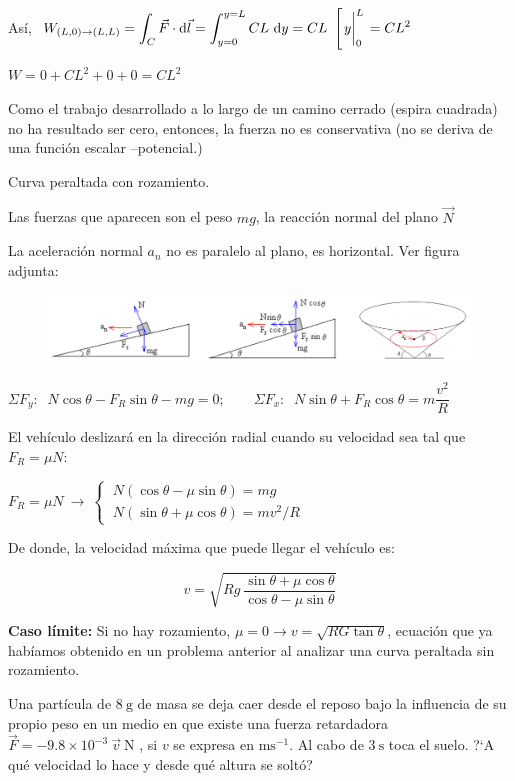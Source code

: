 Así, $\ \displaystyle W_{(L,0) \to (L,L)} = \int_C \vec F \cdot \dd \vec l = \int_{y=0}^{y=L} C L \ \dd y= C L \ \left[ \eval{y}_0^L \right.=C L^2$

$W=0+CL^2+0+0=CL^2$

Como el trabajo desarrollado a lo largo de un camino cerrado (espira cuadrada) no ha resultado ser cero, entonces, la fuerza no es conservativa (no se deriva de una función escalar --potencial.) 


\begin{prob}
Curva peraltada con rozamiento.	
\end{prob}

Las fuerzas que aparecen son el peso $mg$, la reacción normal del plano $\vec N$

La aceleración normal $a_n$ no es paralelo al plano, es horizontal. Ver figura adjunta:

\begin{figure}[H]
	\centering
	\includegraphics[width=1\textwidth]{imagenes/imagenes03/T03IM56.png}
	\end{figure}

\noindent $\Sigma F_y:\;\; N\cos \theta-F_R \sin \theta -mg=0;\qquad \Sigma F_x:\;\; N\sin \theta+F_R \cos \theta =m \dfrac {v^2}{R}$

El vehículo deslizará en la dirección radial cuando su velocidad sea tal que $F_R=\mu N$:

$F_R=\mu N \ \to \ \begin{cases} \ N(\cos \theta-\mu \sin \theta)=mg \\ \ N(\sin \theta+\mu \cos \theta)=mv^2/R \end{cases} $


De donde, la velocidad máxima que puede llegar el vehículo es: 

$$ v=\sqrt{Rg \ \dfrac {\sin \theta + \mu \cos \theta} {\cos \theta - \mu \sin \theta}} $$

\textbf{Caso límite:} Si no hay rozamiento, $\mu=0 \to v= \sqrt{RG\tan \theta}$, ecuación que ya habíamos obtenido en un problema anterior al analizar una curva peraltada sin rozamiento.


\begin{prob}
Una partícula de $8 \ \mathrm{g}$  de masa se deja caer desde el reposo bajo la influencia de su propio peso	 en un medio en que existe una fuerza retardadora $\vec F=-9.8\times 10^{-3}\ \vec v\  \mathrm{N}$ , si $v$ se expresa en $\mathrm{ms}^{-1}$. Al cabo de $3\ \mathrm{s}$  toca el suelo. ?`A qué velocidad lo hace y desde qué altura se soltó?
\end{prob}

